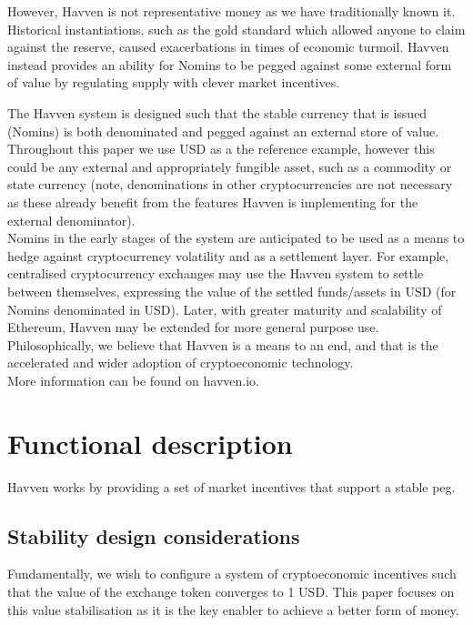 \documentclass{article}
\begin{document}
\noindent However, Havven is not representative money as we have traditionally known it. Historical instantiations, such as the gold standard which allowed anyone to claim against the reserve, caused exacerbations in times of economic turmoil. Havven instead provides an ability for Nomins to be pegged against some external form of value by regulating supply with clever market incentives.

\noindent The Havven system is designed such that the stable currency that is issued (Nomins) is both denominated and pegged against an external store of value. Throughout this paper we use USD as a the reference example, however this could be any external and appropriately fungible asset, such as a commodity or state currency (note, denominations in other cryptocurrencies are not necessary as these already benefit from the features Havven is implementing for the external denominator). \\

\noindent Nomins in the early stages of the system are anticipated to be used as a means to hedge against cryptocurrency volatility and as a settlement layer. For example, centralised cryptocurrency exchanges may use the Havven system to settle between themselves, expressing the value of the settled funds/assets in USD (for Nomins denominated in USD). Later, with greater maturity and scalability of Ethereum, Havven may be extended for more general purpose use. \\

\noindent Philosophically, we believe that Havven is a means to an end, and that is the accelerated and wider adoption of cryptoeconomic technology. \\

\noindent More information can be found on havven.io.


\pagebreak
\section{Functional description}

Havven works by providing a set of market incentives that support a stable peg.

\subsection{Stability design considerations}

Fundamentally, we wish to configure a system of cryptoeconomic incentives such that the value of the exchange token converges to 1 USD. This paper focuses on this value stabilisation as it is the key enabler to achieve a better form of money. \\
\end{document}
